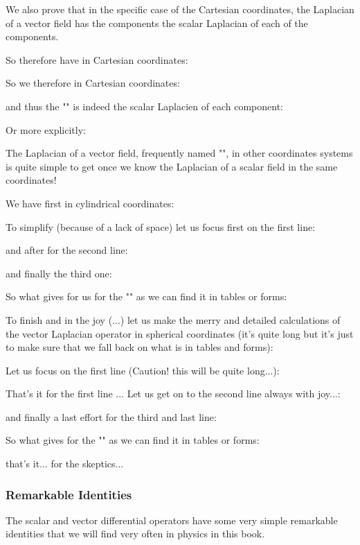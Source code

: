	We also prove that in the specific case of the Cartesian coordinates, the Laplacian of a vector field has the components the scalar Laplacian of each of the components.
	
	So therefore have in Cartesian coordinates:
	
	So we therefore in Cartesian coordinates:
	
	and thus the "" is indeed the scalar Laplacien of each component:
	
	Or more explicitly:
	
	The Laplacian of a vector field, frequently named "", in other coordinates systems is quite simple to get once we know the Laplacian of a scalar field in the same coordinates!
	
	We have first in cylindrical coordinates:
	
	To simplify (because of a lack of space) let us focus first on the first line:
	
	and after for the second line:
	
	and finally the third one:
	
	So what gives for us for the "" as we can find it in tables or forms:
	
	To finish and in the joy (...) let us make the merry and detailed calculations of the vector Laplacian operator in spherical coordinates (it's quite long but it's just to make sure that we fall back on what is in tables and forms):
	
	Let us focus on the first line (Caution! this will be quite long...):
	
	\pagebreak
	
	That's it for the first line ... Let us get on to the second line always with joy...:
	
	
	\pagebreak
	and finally a last effort for the third and last line:
	

	\pagebreak
	
	So what gives for the "" as we can find it in tables or forms:
	
	that's it... for the skeptics...
	
	\subsubsection{Remarkable Identities}
	The scalar and vector differential operators have some very simple remarkable identities that we will find very often in physics in this book.
	
